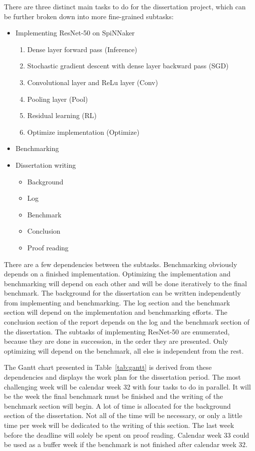 \documentclass{article}
\begin{document}
There are three distinct main tasks to do for the
dissertation project, which can be further broken
down into more fine-grained subtasks:
\begin{itemize}
  \item Implementing ResNet-50 on SpiNNaker
    \begin{enumerate}
      \item Dense layer forward pass (Inference)
        \citep[see][]{goodfellow2016}
      \item Stochastic gradient descent with dense layer
        backward pass (SGD) \citep[see][]{goodfellow2016}
      \item Convolutional layer and ReLu layer (Conv)
        \citep[see][]{goodfellow2016}
      \item Pooling layer (Pool)
        \citep[see][]{goodfellow2016}
      \item Residual learning (RL)
        \citep[see][]{he_et_al_2015}
      \item Optimize implementation (Optimize)
    \end{enumerate}
  \item Benchmarking
  \item Dissertation writing
    \begin{itemize}
      \item Background
      \item Log
      \item Benchmark
      \item Conclusion
      \item Proof reading
    \end{itemize}
\end{itemize}
There are a few dependencies between the subtasks.
Benchmarking obviously depends on a finished
implementation.
Optimizing the implementation and benchmarking will depend
on each other and will be done iteratively to the final
benchmark.
The background for the dissertation can be written
independently from implementing and benchmarking.
The log section and the benchmark section will depend on
the implementation and benchmarking efforts.
The conclusion section of the report depends on the log and
the benchmark section of the dissertation.
The subtasks of implementing ResNet-50 are enumerated,
because they are done in succession, in the order they
are presented.
Only optimizing will depend on the benchmark, all else is
independent from the rest.

The Gantt chart presented in Table~\ref{tab:gantt} is
derived from these dependencies and displays the work plan
for the dissertation period.
The most challenging week will be calendar week 32 with
four tasks to do in parallel.
It will be the week the final benchmark must be finished
and the writing of the benchmark section will begin.
A lot of time is allocated for the background section of the
dissertation.
Not all of the time will be necessary, or only a little
time per week will be dedicated to the writing of this
section.
The last week before the deadline will solely be spent on
proof reading.
Calendar week 33 could be used as a buffer week if
the benchmark is not finished after calendar week 32.
\end{document}
